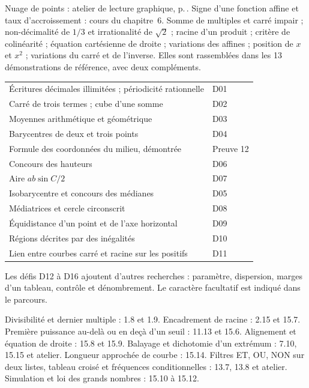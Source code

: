 {\fontsize{9.5}{12}\selectfont Nuage de points : atelier de lecture graphique, p.\,\pageref{atelier-nuage}. Signe d’une fonction affine et taux d’accroissement : cours du chapitre~6.}
\clearpage{}
Somme de multiples et carré impair ; non-décimalité de $1/3$ et irrationalité de $\sqrt2$ ; racine d’un produit ; critère de colinéarité ; équation cartésienne de droite ; variations des affines ; position de $x$ et $x^2$ ; variations du carré et de l’inverse. Elles sont rassemblées dans les 13 démonstrations de référence, avec deux compléments.\par\medskip
{}
\begin{tabularx}{\linewidth}{@{}Yl@{}}\toprule
Écritures décimales illimitées ; périodicité rationnelle & D01\\[1.5mm]
Carré de trois termes ; cube d’une somme & D02\\[1.5mm]
Moyennes arithmétique et géométrique & D03\\[1.5mm]
Barycentres de deux et trois points & D04\\[1.5mm]
Formule des coordonnées du milieu, démontrée & Preuve 12\\[1.5mm]
Concours des hauteurs & D06\\[1.5mm]
Aire $ab\sin C/2$ & D07\\[1.5mm]
Isobarycentre et concours des médianes & D05\\[1.5mm]
Médiatrices et cercle circonscrit & D08\\[1.5mm]
Équidistance d’un point et de l’axe horizontal & D09\\[1.5mm]
Régions décrites par des inégalités & D10\\[1.5mm]
Lien entre courbes carré et racine sur les positifs & D11\\\bottomrule
\end{tabularx}\par\medskip
Les défis D12 à D16 ajoutent d’autres recherches : paramètre, dispersion, marges d’un tableau, contrôle et dénombrement. Le caractère facultatif est indiqué dans le parcours.\par\medskip
{}
Divisibilité et dernier multiple : 1.8 et 1.9. Encadrement de racine : 2.15 et 15.7. Première puissance au-delà ou en deçà d’un seuil : 11.13 et 15.6. Alignement et équation de droite : 15.8 et 15.9. Balayage et dichotomie d’un extrémum : 7.10, 15.15 et atelier. Longueur approchée de courbe : 15.14. Filtres ET, OU, NON sur deux listes, tableau croisé et fréquences conditionnelles : 13.7, 13.8 et atelier. Simulation et loi des grands nombres : 15.10 à 15.12.
\clearpage